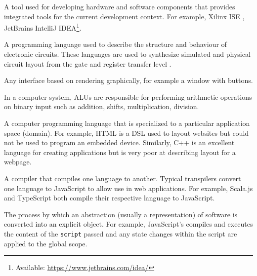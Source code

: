 \begin{definition}
    A tool used for developing hardware and software components that provides integrated tools for the current development context. For example, Xilinx ISE \cite{xilinxISE}, JetBrains IntelliJ IDEA\footnote{Available: \url{https://www.jetbrains.com/idea/}}.
\end{definition}

\begin{definition}
    A programming language used to describe the structure and behaviour of electronic circuits. These languages are used to synthesize simulated and physical circuit layout from the gate and register transfer level \cite{Chu2006}.
\end{definition}

\begin{definition}
    Any interface based on rendering graphically, for example a window with buttons. 
\end{definition}

\begin{definition}
    In a computer system, ALUs are responsible for performing arithmetic operations on binary input such as addition, shifts, multiplication, division.
\end{definition}

\begin{definition}
    A computer programming language that is specialized to a particular application space (domain). For example, HTML is a DSL used to layout websites but could not be used to program an embedded device. Similarly, C++ is an excellent language for creating applications but is very poor at describing layout for a webpage.
\end{definition}

\begin{definition}[Transpiler]
    A compiler that compiles one language to another. Typical transpilers convert one language to JavaScript to allow use in web applications. For example, Scala.js and TypeScript both compile their respective language to JavaScript.
\end{definition}

\begin{definition}[Reification]
    The process by which an abstraction (usually a  representation) of software is converted into an explicit object. For example, JavaScript's  compiles and executes the content of the \verb|script| passed and any state changes within the script are applied to the global scope.
\end{definition}

